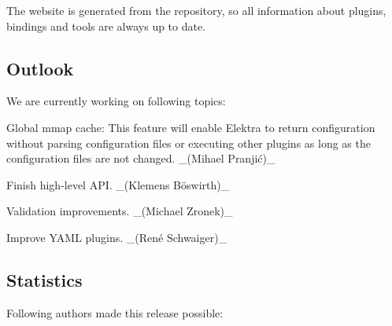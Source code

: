 The website is generated from the repository, so all information about plugins, bindings and tools are always up to date.

\subsection*{Outlook}

We are currently working on following topics\+:


\begin{DoxyItemize}
\item Global mmap cache\+: This feature will enable Elektra to return configuration without parsing configuration files or executing other plugins as long as the configuration files are not changed. \+\_\+(Mihael Pranjić)\+\_\+
\item Finish high-\/level A\+PI. \+\_\+(Klemens Böswirth)\+\_\+
\item Validation improvements. \+\_\+(\+Michael Zronek)\+\_\+
\item Improve Y\+A\+ML plugins. \+\_\+(René Schwaiger)\+\_\+
\end{DoxyItemize}

\subsection*{Statistics}

Following authors made this release possible\+:

